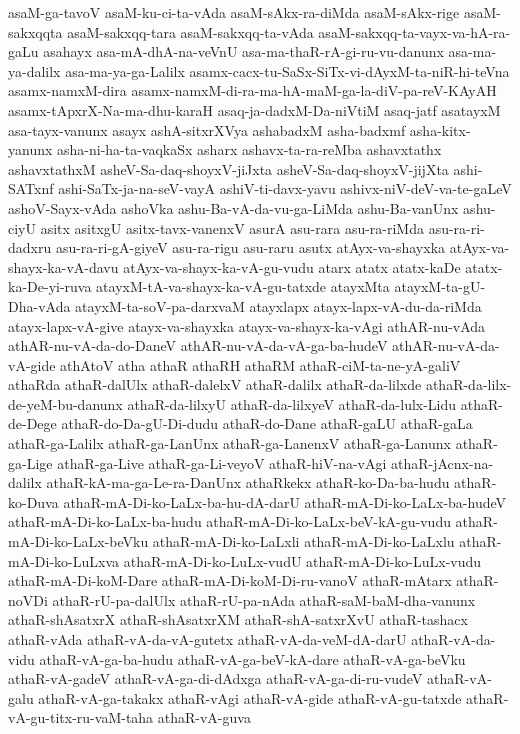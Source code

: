 {asaM-ga-tavoV
asaM-ku-ci-ta-vAda
asaM-sAkx-ra-diMda
asaM-sAkx-rige
asaM-sakxqqta
asaM-sakxqq-tara
asaM-sakxqq-ta-vAda
asaM-sakxqq-ta-vayx-va-hA-ra-gaLu
asahayx
asa-mA-dhA-na-veVnU
asa-ma-thaR-rA-gi-ru-vu-danunx
asa-ma-ya-dalilx
asa-ma-ya-ga-Lalilx
asamx-cacx-tu-SaSx-SiTx-vi-dAyxM-ta-niR-hi-teVna
asamx-namxM-dira
asamx-namxM-di-ra-ma-hA-maM-ga-la-diV-pa-reV-KAyAH
asamx-tApxrX-Na-ma-dhu-karaH
asaq-ja-dadxM-Da-niVtiM
asaq-jatf
asatayxM
asa-tayx-vanunx
asayx
ashA-sitxrXVya
ashabadxM
asha-badxmf
asha-kitx-yanunx
asha-ni-ha-ta-vaqkaSx
asharx
ashavx-ta-ra-reMba
ashavxtathx
ashavxtathxM
asheV-Sa-daq-shoyxV-jiJxta
asheV-Sa-daq-shoyxV-jijXta
ashi-SATxnf
ashi-SaTx-ja-na-seV-vayA
ashiV-ti-davx-yavu
ashivx-niV-deV-va-te-gaLeV
ashoV-Sayx-vAda
ashoVka
ashu-Ba-vA-da-vu-ga-LiMda
ashu-Ba-vanUnx
ashu-ciyU
asitx
asitxgU
asitx-tavx-vanenxV
asurA
asu-rara
asu-ra-riMda
asu-ra-ri-dadxru
asu-ra-ri-gA-giyeV
asu-ra-rigu
asu-raru
asutx
atAyx-va-shayxka
atAyx-va-shayx-ka-vA-davu
atAyx-va-shayx-ka-vA-gu-vudu
atarx
atatx
atatx-kaDe
atatx-ka-De-yi-ruva
atayxM-tA-va-shayx-ka-vA-gu-tatxde
atayxMta
atayxM-ta-gU-Dha-vAda
atayxM-ta-soV-pa-darxvaM
atayxlapx
atayx-lapx-vA-du-da-riMda
atayx-lapx-vA-give
atayx-va-shayxka
atayx-va-shayx-ka-vAgi
athAR-nu-vAda
athAR-nu-vA-da-do-DaneV
athAR-nu-vA-da-vA-ga-ba-hudeV
athAR-nu-vA-da-vA-gide
athAtoV
atha
athaR
athaRH
athaRM
athaR-ciM-ta-ne-yA-galiV
athaRda
athaR-dalUlx
athaR-dalelxV
athaR-dalilx
athaR-da-lilxde
athaR-da-lilx-de-yeM-bu-danunx
athaR-da-lilxyU
athaR-da-lilxyeV
athaR-da-lulx-Lidu
athaR-de-Dege
athaR-do-Da-gU-Di-dudu
athaR-do-Dane
athaR-gaLU
athaR-gaLa
athaR-ga-Lalilx
athaR-ga-LanUnx
athaR-ga-LanenxV
athaR-ga-Lanunx
athaR-ga-Lige
athaR-ga-Live
athaR-ga-Li-veyoV
athaR-hiV-na-vAgi
athaR-jAcnx-na-dalilx
athaR-kA-ma-ga-Le-ra-DanUnx
athaRkekx
athaR-ko-Da-ba-hudu
athaR-ko-Duva
athaR-mA-Di-ko-LaLx-ba-hu-dA-darU
athaR-mA-Di-ko-LaLx-ba-hudeV
athaR-mA-Di-ko-LaLx-ba-hudu
athaR-mA-Di-ko-LaLx-beV-kA-gu-vudu
athaR-mA-Di-ko-LaLx-beVku
athaR-mA-Di-ko-LaLxli
athaR-mA-Di-ko-LaLxlu
athaR-mA-Di-ko-LuLxva
athaR-mA-Di-ko-LuLx-vudU
athaR-mA-Di-ko-LuLx-vudu
athaR-mA-Di-koM-Dare
athaR-mA-Di-koM-Di-ru-vanoV
athaR-mAtarx
athaR-noVDi
athaR-rU-pa-dalUlx
athaR-rU-pa-nAda
athaR-saM-baM-dha-vanunx
athaR-shAsatxrX
athaR-shAsatxrXM
athaR-shA-satxrXvU
athaR-tashacx
athaR-vAda
athaR-vA-da-vA-gutetx
athaR-vA-da-veM-dA-darU
athaR-vA-da-vidu
athaR-vA-ga-ba-hudu
athaR-vA-ga-beV-kA-dare
athaR-vA-ga-beVku
athaR-vA-gadeV
athaR-vA-ga-di-dAdxga
athaR-vA-ga-di-ru-vudeV
athaR-vA-galu
athaR-vA-ga-takakx
athaR-vAgi
athaR-vA-gide
athaR-vA-gu-tatxde
athaR-vA-gu-titx-ru-vaM-taha
athaR-vA-guva
}
